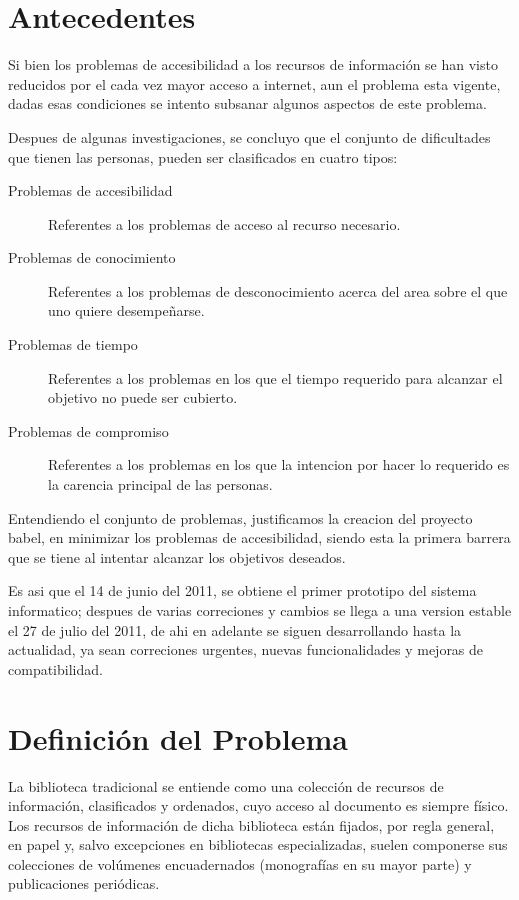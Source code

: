 \documentclass[letter,12pt]{article}
\begin{document}
\section{Antecedentes}
Si bien los problemas de accesibilidad a los recursos de información se han visto reducidos por
el cada vez mayor acceso a internet, aun el problema esta vigente, dadas esas condiciones se
intento subsanar algunos aspectos de este problema.

Despues de algunas investigaciones, se concluyo que el conjunto de dificultades que tienen las
personas, pueden ser clasificados en cuatro tipos:

\begin{description}
\item [Problemas de accesibilidad] Referentes a los problemas de acceso al recurso necesario.
\item [Problemas de conocimiento] Referentes a los problemas de desconocimiento acerca del area
sobre el que uno quiere desempeñarse.
\item [Problemas de tiempo] Referentes a los problemas en los que el tiempo requerido para
alcanzar el objetivo no puede ser cubierto.
\item [Problemas de compromiso] Referentes a los problemas en los que la intencion por hacer lo
requerido es la carencia principal de las personas.
\end{description}

Entendiendo el conjunto de problemas, justificamos la creacion del proyecto babel, en minimizar
los problemas de accesibilidad, siendo esta la primera barrera que se tiene al intentar alcanzar
los objetivos deseados.

Es asi que el 14 de junio del 2011, se obtiene el primer prototipo del sistema informatico; 
despues de varias correciones y cambios se llega a una version estable el 27 de julio del 2011,
de ahi en adelante se siguen desarrollando hasta la actualidad, ya sean correciones urgentes,
nuevas funcionalidades y mejoras de compatibilidad.

\section{Definición del Problema}
La biblioteca tradicional se entiende como una colección de recursos de información, clasificados
y ordenados, cuyo acceso al documento es siempre físico. Los recursos de información de dicha
biblioteca están fijados, por regla general, en papel y, salvo excepciones en bibliotecas
especializadas, suelen componerse sus colecciones de volúmenes encuadernados (monografías en su
mayor parte) y publicaciones periódicas.
\end{document}
